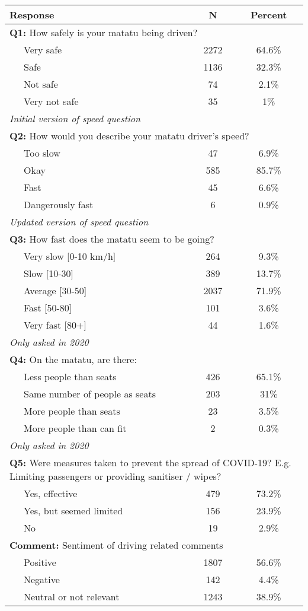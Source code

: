 \begin{tabular}{lcc} 
\hline 
Response & N & Percent \\ 
\hline 
\multicolumn{3}{l}{\textbf{Q1:} How safely is your matatu being driven?} \\ 
~~~Very safe & 2272 & 64.6\% \\ 
 ~~~Safe & 1136 & 32.3\% \\ 
 ~~~Not safe & 74 & 2.1\% \\ 
 ~~~Very not safe & 35 & 1\% \\ 
\hline 
\multicolumn{3}{l}{\textit{Initial version of speed question}} \\ 
\multicolumn{3}{l}{\textbf{Q2:} How would you describe your matatu driver's speed?} \\ 
~~~Too slow & 47 & 6.9\% \\ 
 ~~~Okay & 585 & 85.7\% \\ 
 ~~~Fast & 45 & 6.6\% \\ 
 ~~~Dangerously fast & 6 & 0.9\% \\ 
\hline 
\multicolumn{3}{l}{\textit{Updated version of speed question}} \\ 
\multicolumn{3}{l}{\textbf{Q3:} How fast does the matatu seem to be going?} \\ 
~~~Very slow [0-10 km/h] & 264 & 9.3\% \\ 
 ~~~Slow [10-30] & 389 & 13.7\% \\ 
 ~~~Average [30-50] & 2037 & 71.9\% \\ 
 ~~~Fast [50-80] & 101 & 3.6\% \\ 
 ~~~Very fast [80+] & 44 & 1.6\% \\ 
\hline 
\multicolumn{3}{l}{\textit{Only asked in 2020}} \\ 
\multicolumn{3}{l}{\textbf{Q4:} On the matatu, are there:} \\ 
~~~Less people than seats & 426 & 65.1\% \\ 
 ~~~Same number of people as seats & 203 & 31\% \\ 
 ~~~More people than seats & 23 & 3.5\% \\ 
 ~~~More people than can fit & 2 & 0.3\% \\ 
\hline 
\multicolumn{3}{l}{\textit{Only asked in 2020}} \\ 
\multicolumn{3}{p{8cm}}{\textbf{Q5:} Were measures taken to prevent the spread of COVID-19? E.g. Limiting passengers or providing sanitiser / wipes?} \\ 
~~~Yes, effective & 479 & 73.2\% \\ 
 ~~~Yes, but seemed limited & 156 & 23.9\% \\ 
 ~~~No & 19 & 2.9\% \\ 
\hline 
\multicolumn{3}{p{8cm}}{\textbf{Comment:} Sentiment of driving related comments} \\ 
~~~Positive & 1807 & 56.6\% \\ 
 ~~~Negative & 142 & 4.4\% \\ 
 ~~~Neutral or not relevant & 1243 & 38.9\% \\ 
\hline 
\end{tabular}